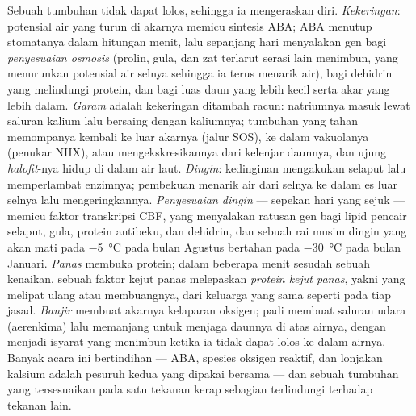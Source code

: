 \begin{definition}\label{def:b3:plant-molecular-physiology:abiotic}
%
Sebuah tumbuhan tidak dapat lolos, sehingga ia mengeraskan diri. \emph{Kekeringan}: potensial air
yang turun di akarnya memicu sintesis ABA; ABA menutup stomatanya dalam
hitungan menit, lalu sepanjang hari menyalakan gen bagi \emph{penyesuaian osmosis}
(prolin, gula, dan zat terlarut serasi lain menimbun, yang menurunkan
potensial air selnya sehingga ia terus menarik air), bagi dehidrin yang
melindungi protein, dan bagi luas daun yang lebih kecil serta akar yang lebih dalam.
\emph{Garam} adalah kekeringan ditambah racun: natriumnya masuk lewat saluran kalium
lalu bersaing dengan kaliumnya; tumbuhan yang tahan memompanya kembali ke luar
akarnya (jalur SOS), ke dalam vakuolanya (penukar NHX), atau mengekskresikannya
dari kelenjar daunnya, dan ujung \emph{halofit}-nya hidup di dalam air laut.
\emph{Dingin}: kedinginan mengakukan selaput lalu memperlambat enzimnya; pembekuan
menarik air dari selnya ke dalam es luar selnya lalu mengeringkannya.
\emph{Penyesuaian dingin} --- sepekan hari yang sejuk --- memicu faktor
transkripsi CBF, yang menyalakan ratusan gen bagi
lipid pencair selaput, gula, protein antibeku, dan dehidrin,
dan sebuah rai musim dingin yang akan mati pada \qty{-5}{\celsius} pada bulan Agustus bertahan
pada \qty{-30}{\celsius} pada bulan Januari. \emph{Panas} membuka  protein; dalam
beberapa menit sesudah sebuah kenaikan, sebuah faktor kejut panas melepaskan \emph{protein kejut
panas}, yakni  yang melipat ulang atau membuangnya, dari keluarga yang sama
seperti pada tiap jasad. \emph{Banjir} membuat akarnya kelaparan oksigen;
padi membuat saluran udara (aerenkima) lalu memanjang untuk menjaga daunnya
di atas airnya, dengan  menjadi isyarat yang menimbun ketika ia tidak dapat
lolos ke dalam airnya. Banyak acara ini bertindihan --- ABA, spesies oksigen
reaktif, dan lonjakan kalsium adalah pesuruh kedua yang dipakai bersama --- dan sebuah
tumbuhan yang tersesuaikan pada satu tekanan kerap sebagian terlindungi terhadap
tekanan lain.
\end{definition}

